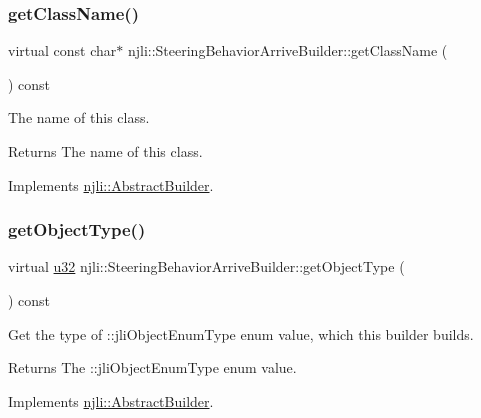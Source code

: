 \subsubsection{\texorpdfstring{get\+Class\+Name()}{getClassName()}}
{\footnotesize\ttfamily virtual const char$\ast$ njli\+::\+Steering\+Behavior\+Arrive\+Builder\+::get\+Class\+Name (\begin{DoxyParamCaption}{ }\end{DoxyParamCaption}) const\hspace{0.3cm}{\ttfamily [virtual]}}

The name of this class.

\begin{DoxyReturn}{Returns}
The name of this class. 
\end{DoxyReturn}


Implements \mbox{\hyperlink{classnjli_1_1_abstract_builder_a902f73ea78031b06aca183a417f3413b}{njli\+::\+Abstract\+Builder}}.

\mbox{\label{classnjli_1_1_steering_behavior_arrive_builder_aeab31c2042c67a36fffcdff213e0d52a}} 
\subsubsection{\texorpdfstring{get\+Object\+Type()}{getObjectType()}}
{\footnotesize\ttfamily virtual \mbox{\hyperlink{_util_8h_a10e94b422ef0c20dcdec20d31a1f5049}{u32}} njli\+::\+Steering\+Behavior\+Arrive\+Builder\+::get\+Object\+Type (\begin{DoxyParamCaption}{ }\end{DoxyParamCaption}) const\hspace{0.3cm}{\ttfamily [virtual]}}

Get the type of \+::jli\+Object\+Enum\+Type enum value, which this builder builds.

\begin{DoxyReturn}{Returns}
The \+::jli\+Object\+Enum\+Type enum value. 
\end{DoxyReturn}


Implements \mbox{\hyperlink{classnjli_1_1_abstract_builder_a0f2d344fcf697b167f4f2b1122b5fb33}{njli\+::\+Abstract\+Builder}}.


